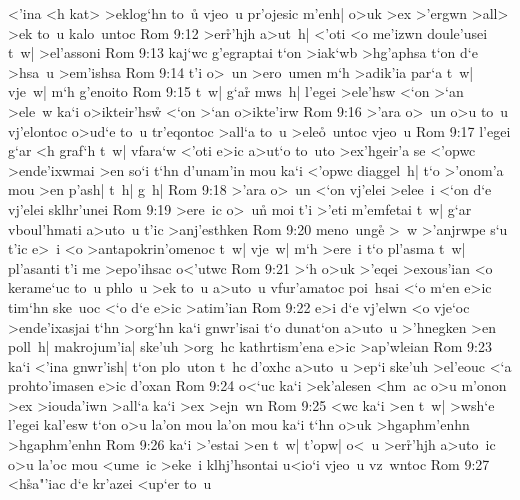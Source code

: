 <'ina
<h
kat>
>eklog`hn
to~u\r{}
vjeo~u
pr'ojesic
m'enh|
o>uk
>ex
>'ergwn
>all>
>ek
to~u
kalo~untoc\bibvsend
\vs Rom 9:12
>er\r{r}'hjh
a>ut~h|
<'oti
<o
me'izwn
doule'usei
t~w|
>el'assoni\bibvsend
\vs Rom 9:13
kaj`wc
g'egraptai
t`on
>iak`wb
>hg'aphsa
t`on
d`e
>hsa~u
>em'ishsa\bibvsend
\vs Rom 9:14
t'i
o>~un
>ero~umen
m`h
>adik'ia
par`a
t~w|
vje~w|
m`h
g'enoito\bibvsend
\vs Rom 9:15
t~w|
g`ar\r{}
mws~h|
l'egei
>ele'hsw
<`on
>`an
>ele~w
ka`i
o>ikteir'hsw\r{}
<`on
>`an
o>ikte'irw\bibvsend
\vs Rom 9:16
>'ara
o>~un
o>u
to~u
vj'elontoc
o>ud`e
to~u
tr'eqontoc
>all`a
to~u
>ele\r{o}~untoc
vjeo~u\bibvsend
\vs Rom 9:17
l'egei
g`ar
<h
graf`h
t~w|
vfara`w
<'oti
e>ic
a>ut`o
to~uto
>ex'hgeir'a
se
<'opwc
>ende'ixwmai
>en
so`i
t`hn
d'unam'in
mou
ka`i
<'opwc
diaggel~h|
t`o
>'onom'a
mou
>en
p'ash|
t~h|
g~h|\bibvsend
\vs Rom 9:18
>'ara
o>~un
<`on
vj'elei
>elee~i
<`on
d`e
vj'elei
sklhr'unei\bibvsend
\vs Rom 9:19
>ere~ic
o>~un\r{}
moi
t'i
>'eti
m'emfetai
t~w|
g`ar
vboul'hmati
a>uto~u
t'ic
>anj'esthken\bibvsend
\vs Rom 9:20
meno~unge\r{}
>~w
>'anjrwpe
s`u
t'ic
e>~i
<o
>antapokrin'omenoc
t~w|
vje~w|
m`h
>ere~i
t`o
pl'asma
t~w|
pl'asanti
t'i
me
>epo'ihsac
o<'utwc\bibvsend
\vs Rom 9:21
>`h
o>uk
>'eqei
>exous'ian
<o
kerame`uc
to~u
phlo~u
>ek
to~u
a>uto~u
vfur'amatoc
poi~hsai
<`o
m`en
e>ic
tim`hn
ske~uoc
<`o
d`e
e>ic
>atim'ian\bibvsend
\vs Rom 9:22
e>i
d`e
vj'elwn
<o
vje`oc
>ende'ixasjai
t`hn
>org`hn
ka`i
gnwr'isai
t`o
dunat`on
a>uto~u
>'hnegken
>en
poll~h|
makrojum'ia|
ske'uh
>org~hc
kathrtism'ena
e>ic
>ap'wleian\bibvsend
\vs Rom 9:23
ka`i
<'ina
gnwr'ish|
t`on
plo~uton
t~hc
d'oxhc
a>uto~u
>ep`i
ske'uh
>el'eouc
<`a
prohto'imasen
e>ic
d'oxan\bibvsend
\vs Rom 9:24
o<`uc
ka`i
>ek'alesen
<hm~ac
o>u
m'onon
>ex
>iouda'iwn
>all`a
ka`i
>ex
>ejn~wn\bibvsend
\vs Rom 9:25
<wc
ka`i
>en
t~w|
>wsh`e
l'egei
kal'esw
t`on
o>u
la'on
mou
la'on
mou
ka`i
t`hn
o>uk
>hgaphm'enhn
>hgaphm'enhn\bibvsend
\vs Rom 9:26
ka`i
>'estai
>en
t~w|
t'opw|
o<~u
>er\r{r}'hjh
a>uto~ic
o>u
la'oc
mou
<ume~ic
>eke~i
klhj'hsontai
u<io`i
vjeo~u
vz~wntoc\bibvsend
\vs Rom 9:27
<h\r{s}a"'iac
d`e
kr'azei
<up`er
to~u
